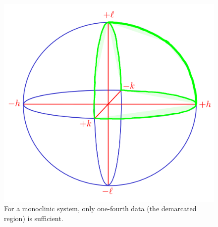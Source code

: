 \begin{figure}
	\centering
	\includegraphics[scale=0.15]{one_fourth_sphere1.png}
	\caption{\label{fig:one_fourth_sphere}For a monoclinic system, only one-fourth data (the demarcated region) is sufficient.}
\end{figure}

